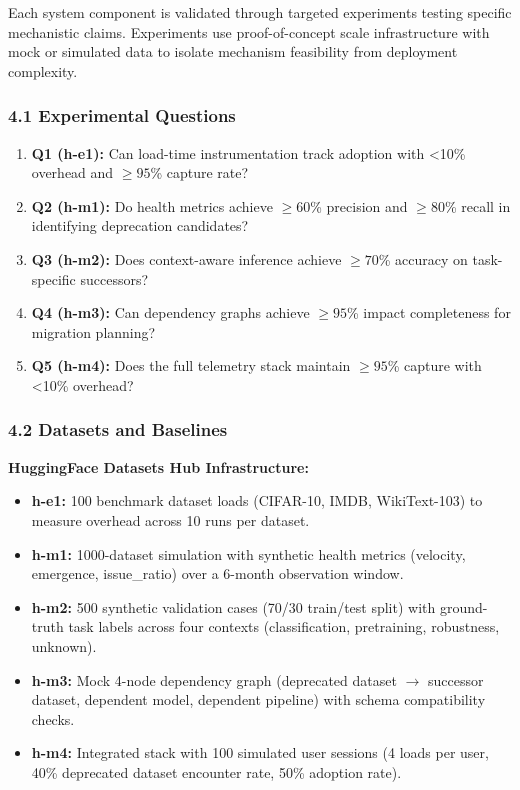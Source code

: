 
Each system component is validated through targeted experiments testing specific mechanistic claims. Experiments use proof-of-concept scale infrastructure with mock or simulated data to isolate mechanism feasibility from deployment complexity.

\subsubsection{4.1 Experimental Questions}

\begin{enumerate}
\item \textbf{Q1 (h-e1):} Can load-time instrumentation track adoption with <10\% overhead and $\geq 95$\% capture rate?
\item \textbf{Q2 (h-m1):} Do health metrics achieve $\geq 60$\% precision and $\geq 80$\% recall in identifying deprecation candidates?
\item \textbf{Q3 (h-m2):} Does context-aware inference achieve $\geq 70$\% accuracy on task-specific successors?
\item \textbf{Q4 (h-m3):} Can dependency graphs achieve $\geq 95$\% impact completeness for migration planning?
\item \textbf{Q5 (h-m4):} Does the full telemetry stack maintain $\geq 95$\% capture with <10\% overhead?
\end{enumerate}

\subsubsection{4.2 Datasets and Baselines}

\textbf{HuggingFace Datasets Hub Infrastructure:}
\begin{itemize}
\item \textbf{h-e1:} 100 benchmark dataset loads (CIFAR-10, IMDB, WikiText-103) to measure overhead across 10 runs per dataset.
\item \textbf{h-m1:} 1000-dataset simulation with synthetic health metrics (velocity, emergence, issue\_ratio) over a 6-month observation window.
\item \textbf{h-m2:} 500 synthetic validation cases (70/30 train/test split) with ground-truth task labels across four contexts (classification, pretraining, robustness, unknown).
\item \textbf{h-m3:} Mock 4-node dependency graph (deprecated dataset $\rightarrow$ successor dataset, dependent model, dependent pipeline) with schema compatibility checks.
\item \textbf{h-m4:} Integrated stack with 100 simulated user sessions (4 loads per user, 40\% deprecated dataset encounter rate, 50\% adoption rate).
\end{itemize}

